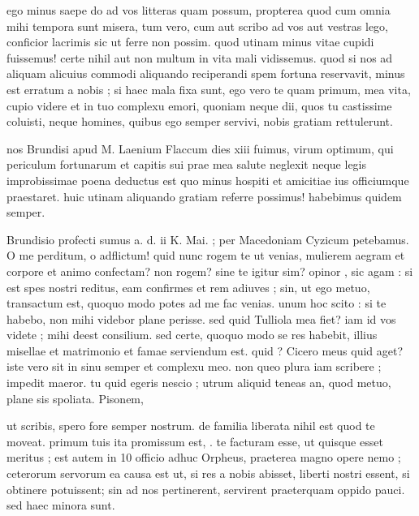 


 ego minus saepe do ad vos litteras quam possum, propterea quod cum omnia mihi tempora sunt misera, tum vero, cum aut scribo ad vos aut vestras lego, conficior lacrimis sic ut ferre non possim. quod utinam minus vitae cupidi fuissemus! certe nihil aut non multum in vita mali vidissemus. quod si nos ad aliquam alicuius commodi aliquando reciperandi spem fortuna reservavit, minus est erratum a nobis ; si haec mala fixa sunt, ego vero te quam primum, mea vita, cupio videre et in tuo complexu emori, quoniam neque dii, quos tu castissime coluisti, neque homines, quibus ego semper servivi, nobis gratiam rettulerunt.

 nos Brundisi apud M. Laenium Flaccum dies xiii fuimus, virum optimum, qui periculum fortunarum et capitis sui prae mea salute neglexit neque legis improbissimae poena deductus est quo minus hospiti et amicitiae ius officiumque praestaret. huic utinam aliquando gratiam referre possimus! habebimus quidem semper.

 Brundisio profecti sumus a. d. ii K. Mai. ; per Macedoniam Cyzicum petebamus. O me perditum, o adflictum! quid nunc rogem te ut venias, mulierem aegram et corpore et animo confectam? non rogem? sine te igitur sim? opinor , sic agam : si est spes nostri reditus, eam confirmes et rem adiuves ; sin, ut ego metuo, transactum est, quoquo modo potes ad me fac venias. unum hoc scito : si te habebo, non mihi videbor plane perisse. sed quid Tulliola mea fiet? iam id vos videte ; mihi deest consilium. sed certe, quoquo modo se res habebit, illius misellae et matrimonio et famae serviendum est. quid ? Cicero meus quid aget? iste vero sit in sinu semper et complexu meo. non queo plura iam scribere ; impedit maeror. tu quid egeris nescio ; utrum aliquid teneas an, quod metuo, plane sis spoliata. Pisonem,

 ut scribis, spero fore semper nostrum. de familia liberata nihil est quod te moveat. primum tuis ita promissum est, . te facturam esse, ut quisque esset meritus ; est autem in 10 officio adhuc Orpheus, praeterea magno opere nemo ; ceterorum servorum ea causa est ut, si res a nobis abisset, liberti nostri essent, si obtinere potuissent; sin ad nos pertinerent, servirent praeterquam oppido pauci. sed haec minora sunt.

